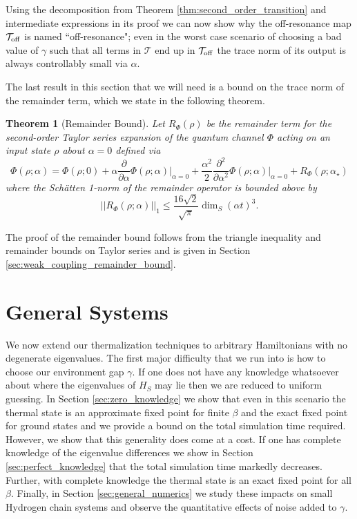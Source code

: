 \documentclass[
 amsmath,amssymb,
 aps,
onecolumn, 
nofootinbib]{revtex4-2}
\newtheorem{theorem}{Theorem}
\newcommand{\off}{\rm off}
\newcommand{\norm}[1]{\left|\left| #1 \right|\right|}
\begin{document}
Using the decomposition from Theorem \ref{thm:second_order_transition} and intermediate expressions in its proof we can now show why the off-resonance map $\mathcal{T}_{\off}$ is named ``off-resonance"; even in the worst case scenario of choosing a bad value of $\gamma$ such that all terms in $\mathcal{T}$ end up in $\mathcal{T}_{\off}$ the trace norm of its output is always controllably small via $\alpha$.

The last result in this section that we will need is a bound on the trace norm of the remainder term, which we state in the following theorem.
\begin{theorem}[Remainder Bound] \label{thm:remainder_bound}
    Let $R_{\Phi}(\rho)$ be the remainder term for the second-order Taylor series expansion 
of the quantum channel $\Phi$ acting on an input state $\rho$ about $\alpha=0$ defined via
    $$\Phi(\rho; \alpha) = \Phi(\rho; 0) + \alpha \frac{\partial}{\partial \alpha} \Phi(\rho; \alpha) \big|_{\alpha = 0} + \frac{\alpha^2}{2} \frac{\partial^2}{\partial \alpha^2} \Phi(\rho; \alpha) \big|_{\alpha = 0} + R_{\Phi}(\rho; \alpha_{\star})$$ where the Sch\"{a}tten 1-norm of the remainder operator is bounded above by
    \begin{equation}
        \norm{R_{\Phi}(\rho;\alpha)}_1 \le \frac{16 \sqrt{2}}{\sqrt{\pi}} \dim_S (\alpha t)^3.
    \end{equation}
\end{theorem}
The proof of the remainder bound follows from the triangle inequality and remainder bounds on Taylor series and is given in Section \ref{sec:weak_coupling_remainder_bound}.



\section{General Systems} \label{sec:general_systems}

We now extend our thermalization techniques to arbitrary Hamiltonians with no degenerate eigenvalues. The first major difficulty that we run into is how to choose our environment gap $\gamma$. If one does not have any knowledge whatsoever about where the eigenvalues of $H_S$ may lie then we are reduced to uniform guessing. In Section \ref{sec:zero_knowledge} we show that even in this scenario the thermal state is an approximate fixed point for finite $\beta$ and the exact fixed point for ground states and we provide a bound on the total simulation time required. However, we show that this generality does come at a cost. If one has complete knowledge of the eigenvalue differences we show in Section \ref{sec:perfect_knowledge} that the total simulation time markedly decreases. Further, with complete knowledge the thermal state is an exact fixed point for all $\beta$. Finally, in Section \ref{sec:general_numerics} we study these impacts on small Hydrogen chain systems and observe the quantitative effects of noise added to $\gamma$. 
\end{document}
